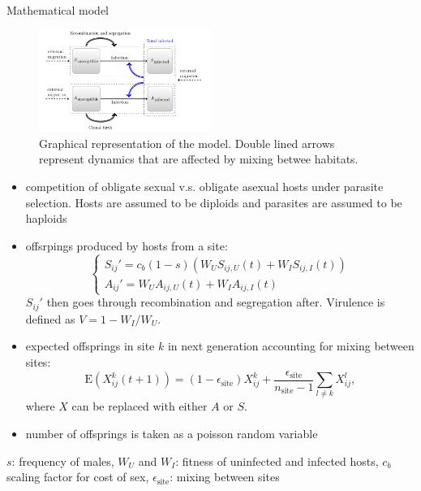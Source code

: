 \documentclass{beamer}
\begin{document}
\begin{frame}{Mathematical model}
\begin{figure}
\includegraphics[width=0.5\textwidth]{../fig/model_diagram.pdf}
\caption{Graphical representation of the model. Double lined arrows represent dynamics that are affected by mixing betwee habitats.}
\vspace{-1em}
\end{figure}
\begin{itemize}
    \item competition of obligate sexual v.s. obligate asexual hosts under parasite selection. Hosts are assumed to be diploids and parasites are assumed to be haploids \cite{lively2010epidemiological}
\end{itemize}
\end{frame}

\begin{frame}
\begin{itemize}
    \item offsrpings produced by hosts from a site:
    $$
    \begin{cases}
    S_{ij}' = c_b (1-s) \left(W_U S_{ij,U} (t) + W_I S_{ij,I} (t)\right)\\
    A_{ij}' = W_U A_{ij,U} (t) + W_I A_{ij,I} (t)
    \end{cases}
    $$
    $S_{ij}'$ then goes through recombination and segregation after. Virulence is defined as $V = 1-W_I/W_U$.
    \item expected offsprings in site $k$ in next generation accounting for mixing between sites:
    $$
    \mathrm{E}\left(X_{ij}^k(t+1)\right) = (1 - \epsilon_{\textrm{site}}) X_{ij}^k + \frac{\epsilon_{\textrm{site}}}{n_{\textrm{site}}-1} \sum_{l \neq k} X_{ij}^l,
    $$
    where $X$ can be replaced with either $A$ or $S$.
    \item number of offsprings is taken as a poisson random variable 
\end{itemize}
\vfill
$s$: frequency of males, $W_U$ and $W_I$: fitness of uninfected and infected hosts, $c_b$ scaling factor for cost of sex, $\epsilon_{\textrm{site}}$: mixing between sites
\end{frame}
\end{document}
